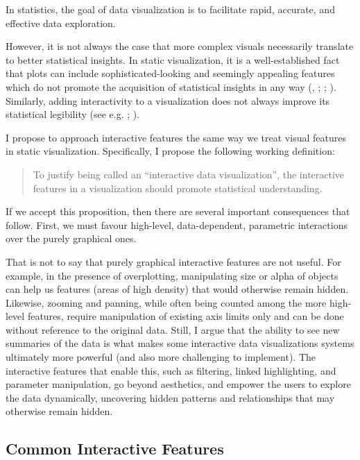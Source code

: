 \documentclass[
]{book}
\theoremstyle{definition}
\theoremstyle{definition}
\theoremstyle{definition}
\theoremstyle{definition}
\theoremstyle{remark}
\begin{document}
In statistics, the goal of data visualization is to facilitate rapid, accurate, and effective data exploration.

However, it is not always the case that more complex visuals necessarily translate to better statistical insights. In static visualization, it is a well-established fact that plots can include sophisticated-looking and seemingly appealing features which do not promote the acquisition of statistical insights in any way (, ; ; ). Similarly, adding interactivity to a visualization does not always improve its statistical legibility (see e.g. ; ).

I propose to approach interactive features the same way we treat visual features in static visualization. Specifically, I propose the following working definition:

\begin{quote}
To justify being called an ``interactive data visualization'', the interactive features in a visualization should promote statistical understanding.
\end{quote}

If we accept this proposition, then there are several important consequences that follow. First, we must favour high-level, data-dependent, parametric interactions over the purely graphical ones.

That is not to say that purely graphical interactive features are not useful. For example, in the presence of overplotting, manipulating size or alpha of objects can help us features (areas of high density) that would otherwise remain hidden. Likewise, zooming and panning, while often being counted among the more high-level features, require manipulation of existing axis limits only and can be done without reference to the original data. Still, I argue that the ability to see new summaries of the data is what makes some interactive data visualizations systems ultimately more powerful (and also more challenging to implement). The interactive features that enable this, such as filtering, linked highlighting, and parameter manipulation, go beyond aesthetics, and empower the users to explore the data dynamically, uncovering hidden patterns and relationships that may otherwise remain hidden.

\subsection{Common Interactive Features}\label{common-interactive-features}
\end{document}
